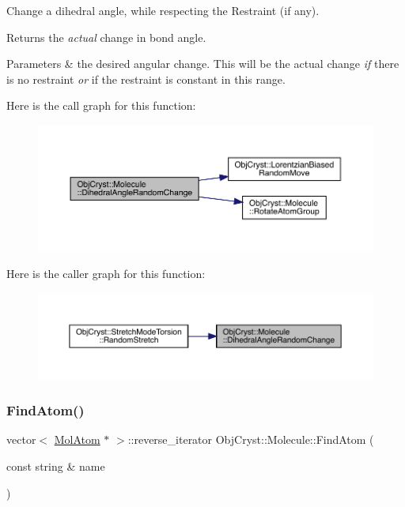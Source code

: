 Change a dihedral angle, while respecting the Restraint (if any).

\begin{DoxyReturn}{Returns}
the {\itshape actual} change in bond angle. 
\end{DoxyReturn}

\begin{DoxyParams}{Parameters}
{\em } & the desired angular change. This will be the actual change {\itshape if} there is no restraint {\itshape or} if the restraint is constant in this range. \\
\hline
\end{DoxyParams}
Here is the call graph for this function\+:
\nopagebreak
\begin{figure}[H]
\begin{center}
\leavevmode
\includegraphics[width=350pt]{class_obj_cryst_1_1_molecule_afd88ae76ab528b5dc37f9d2527353904_cgraph}
\end{center}
\end{figure}
Here is the caller graph for this function\+:
\nopagebreak
\begin{figure}[H]
\begin{center}
\leavevmode
\includegraphics[width=350pt]{class_obj_cryst_1_1_molecule_afd88ae76ab528b5dc37f9d2527353904_icgraph}
\end{center}
\end{figure}
\mbox{\label{class_obj_cryst_1_1_molecule_a7dcd70a612a14005d569322e3030291f}} 
\subsubsection{\texorpdfstring{FindAtom()}{FindAtom()}\hspace{0.1cm}{\footnotesize\ttfamily [1/2]}}
{\footnotesize\ttfamily vector$<$ \mbox{\hyperlink{class_obj_cryst_1_1_mol_atom}{Mol\+Atom}} $\ast$ $>$\+::reverse\+\_\+iterator Obj\+Cryst\+::\+Molecule\+::\+Find\+Atom (\begin{DoxyParamCaption}\item[{const string \&}]{name }\end{DoxyParamCaption})}

